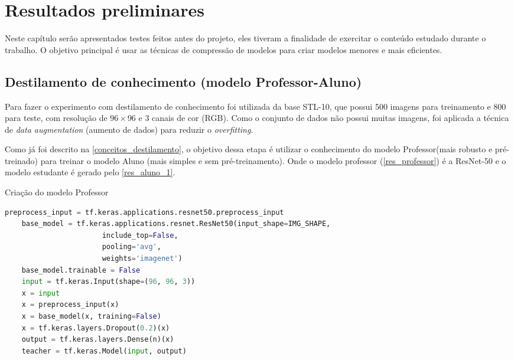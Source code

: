 \chapter{Resultados preliminares}

Neste capítulo serão apresentados testes feitos antes do projeto, eles tiveram a finalidade de exercitar o
conteúdo estudado durante o trabalho. O objetivo principal é usar as técnicas de compressão de modelos para
criar modelos menores e mais eficientes.


\section{Destilamento de conhecimento (modelo Professor-Aluno)}
Para fazer o experimento com destilamento de conhecimento foi utilizada da base STL-10, que possui 500 imagens para
treinamento e 800 para teste, com resolução de $96 \times 96$ e 3 canais de cor (RGB). Como o conjunto de dados
não possui muitas imagens, foi aplicada a técnica de \textit{data augmentation} (aumento de dados) para reduzir o
\textit{overfitting}.

Como já foi descrito na \autoref{conceitos_destilamento}, o objetivo dessa etapa é utilizar o conhecimento do modelo
Professor(mais robusto e pré-treinado) para treinar o modelo Aluno (mais simples e sem pré-treinamento).
Onde o modelo professor (\autoref{res_professor}) é a ResNet-50  \cite{resnet} e o modelo estudante é gerado pelo
\autoref{res_aluno_1}.

\begin{codigo}[!htb]
    \caption{Criação do modelo Professor}
    \label{res_professor}
    \begin{lstlisting}[language = python]
	preprocess_input = tf.keras.applications.resnet50.preprocess_input
	base_model = tf.keras.applications.resnet.ResNet50(input_shape=IMG_SHAPE,
					   include_top=False,
					   pooling='avg',
					   weights='imagenet')
	base_model.trainable = False
	input = tf.keras.Input(shape=(96, 96, 3))
	x = input
	x = preprocess_input(x)
	x = base_model(x, training=False)
	x = tf.keras.layers.Dropout(0.2)(x)
	output = tf.keras.layers.Dense(n)(x)
	teacher = tf.keras.Model(input, output)
    \end{lstlisting}
\end{codigo}

